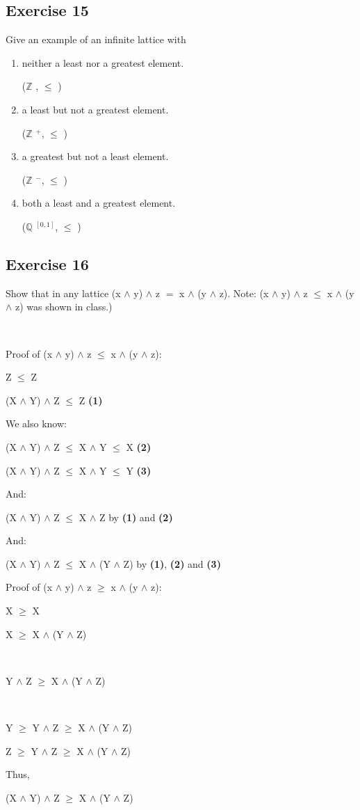\documentclass{article}
\newcommand{\mt}[1]{\ensuremath{#1}}
\newcommand\ssc[2][\DefaultOpt]{%
  \def\DefaultOpt{#2}%
  \subsection[#1]{#2}%
}
\newcommand{\balist}{\begin{enumerate}[label=\alph*.]}
\newcommand{\elist}{\end{enumerate}}
\newcommand{\bpth}[1]{\textbf{(#1)}}
\newcommand{\bq}{\mt{\mathbb{Q}} }       %
\newcommand{\bz}{\mt{\mathbb{Z}} }       %
\newcommand{\lse}{\mt{\leq} }
\newcommand{\gre}{\mt{\geq} }
\newcommand{\eql}{\mt{=} }
\newcommand{\uf}[2]{#1\mt{^{#2}}}
\newcommand{\lgnd}{\mt{\land} }
\begin{document}
\ssc{Exercise 15}{

Give an example of an infinite lattice with 

\balist
\item neither a least nor a greatest element.

(\bz, \lse)

\item a least but not a greatest element.

(\uf{\bz}{+}, \lse)

\item a greatest but not a least element.

(\uf{\bz}{-}, \lse)

\item both a least and a greatest element.

(\uf{\bq}{[0, 1]}, \lse)

\elist

}

\ssc{Exercise 16}{

Show that in any lattice (x \lgnd y) \lgnd z \eql x \lgnd (y \lgnd z). Note: (x \lgnd y) \lgnd z \lse x \lgnd (y \lgnd z) was shown in class.)

\

Proof of (x \lgnd y) \lgnd z \lse x \lgnd (y \lgnd z):

Z \lse Z

(X \lgnd Y) \lgnd Z \lse Z \bpth{1}

We also know:

(X \lgnd Y) \lgnd Z \lse X \lgnd Y \lse X \bpth{2}

(X \lgnd Y) \lgnd Z \lse X \lgnd Y \lse Y \bpth{3}

And:

(X \lgnd Y) \lgnd Z \lse X \lgnd Z by \bpth{1} and \bpth{2}

And:

(X \lgnd Y) \lgnd Z \lse X \lgnd (Y \lgnd Z) by \bpth{1}, \bpth{2} and \bpth{3}

\newpage

Proof of (x \lgnd y) \lgnd z \gre x \lgnd (y \lgnd z):

X \gre X

X \gre X \lgnd (Y \lgnd Z)

\

Y \lgnd Z \gre X \lgnd (Y \lgnd Z)

\

Y \gre Y \lgnd Z \gre X \lgnd (Y \lgnd Z)

Z \gre Y \lgnd Z \gre X \lgnd (Y \lgnd Z)

Thus,

(X \lgnd Y) \lgnd Z \gre X \lgnd (Y \lgnd Z)



}
\end{document}
